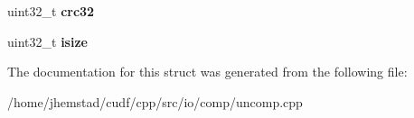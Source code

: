 \begin{DoxyCompactItemize}
\item 
uint32\+\_\+t {\bfseries crc32}\hypertarget{structgz__archive__s_a6b466836832ccc0a0e394ca787076f46}{}\label{structgz__archive__s_a6b466836832ccc0a0e394ca787076f46}

\item 
uint32\+\_\+t {\bfseries isize}\hypertarget{structgz__archive__s_aece66cf9c21b542997de521a1d1e9405}{}\label{structgz__archive__s_aece66cf9c21b542997de521a1d1e9405}

\end{DoxyCompactItemize}


The documentation for this struct was generated from the following file\+:\begin{DoxyCompactItemize}
\item 
/home/jhemstad/cudf/cpp/src/io/comp/uncomp.\+cpp\end{DoxyCompactItemize}
